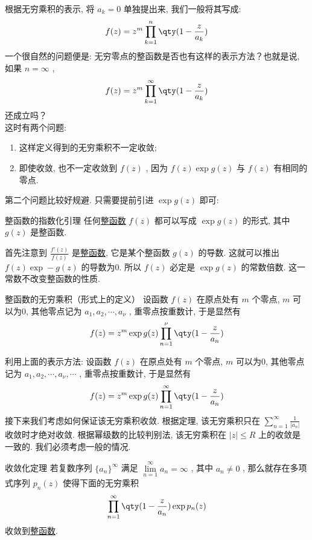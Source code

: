 \documentclass[UTF8]{ctexart}
\begin{document}
根据无穷乘积的表示, 将 \( a_k=0 \) 单独提出来, 我们一般将其写成: 
\[f(z)=z^m\prod_{k=1}^{n}\qty(1-\frac{z}{a_k})\]
一个很自然的问题便是: 无穷零点的整函数是否也有这样的表示方法？也就是说, 如果 \( n=\infty \) , 
\[f(z)=z^m\prod_{k=1}^{\infty}\qty(1-\frac{z}{a_k})\]
还成立吗？\\
这时有两个问题: \begin{enumerate}
    \item 这样定义得到的无穷乘积不一定收敛; 
    \item 即使收敛, 也不一定收敛到 \( f(z) \) , 因为 \( f(z)\exp g(z) \) 与 \( f(z) \) 有相同的零点. 
\end{enumerate}
第二个问题比较好规避. 只需要提前引进 \( \exp g(z) \) 即可: 
\begin{lma}
    {整函数的指数化引理}
    任何\hyperref[dfn:EntireFunction]{整函数} \( f(z) \) 都可以写成 \( \exp g(z) \) 的形式, 其中 \( g(z) \) 是整函数.
\end{lma}
\begin{prf}
    首先注意到 \( \frac{f'(z)}{f(z)} \) 是\hyperref[dfn:EntireFunction]{整函数}, 它是某个整函数 \( g(z) \) 的导数. 这就可以推出 \( f(z)\exp -g(z) \) 的导数为0. 所以 \( f(z) \) 必定是 \( \exp g(z) \) 的常数倍数. 这一常数不改变整函数的性质. 
\end{prf}
\begin{dfn}
    {整函数的无穷乘积（形式上的定义）}
    设函数 \( f(z) \) 在原点处有 \( m \) 个零点,  \( m \) 可以为0, 其他零点记为 \( a_1,a_2,\cdots, a_\nu \) , 重零点按重数计, 于是显然有
    \[f(z)=z^m\exp g(z)\prod_{n=1}^{\nu}\qty(1-\frac{z}{a_n})\]
\end{dfn}
利用上面的表示方法: 设函数 \( f(z) \) 在原点处有 \( m \) 个零点,  \( m \) 可以为0, 其他零点记为 \( a_1,a_2,\cdots, a_\nu, \cdots \) , 重零点按重数计, 于是显然有
\[f(z)=z^m\exp g(z)\prod_{n=1}^{\infty}\qty(1-\frac{z}{a_n})\]
接下来我们考虑如何保证该无穷乘积收敛. 根据定理, 该无穷乘积只在 \( \sum\limits_{n=1}^{\infty}\frac{1}{|a_n|} \) 收敛时才绝对收敛. 根据幂级数的比较判别法, 该无穷乘积在 \( |z|\leqslant R \) 上的收敛是一致的. 我们必须考虑一般的情况. 
\begin{thm}
    {收敛化定理}
    若复数序列 \( \{a_n\}^\infty \) 满足 \( \lim\limits_{n=1}^{\infty}a_n=\infty \) , 其中 \( a_n\neq 0 \) , 那么就存在多项式序列 \( p_n(z) \) 使得下面的无穷乘积
    \[\prod_{n=1}^{\infty}\qty(1-\frac{z}{a_n})\exp p_n(z)\]
    收敛到\hyperref[dfn:EntireFunction]{整函数}.
\end{thm}
\end{document}

